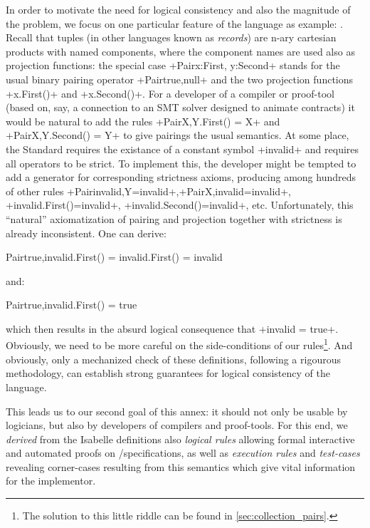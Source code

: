 In order to motivate the need for logical consistency and also the magnitude of the problem,
we focus on one particular feature of the language as example: . Recall that 
tuples (in other languages known as \emph{records}) are n-ary cartesian products with named 
components, where the component names are used also as projection functions: the special case 
\inlineocl+Pair{x:First, y:Second}+ stands for the usual binary pairing operator 
\inlineocl+Pair{true,null}+ and the two projection functions
\inlineocl+x.First()+ and \inlineocl+x.Second()+. For a developer of a compiler or proof-tool
(based on, say, a connection to an SMT solver designed to animate \OCL contracts) it would be natural 
to add the rules \inlineocl+Pair{X,Y}.First() = X+ and \inlineocl+Pair{X,Y}.Second() = Y+ to give
pairings the usual semantics. At some place, the \OCL Standard requires the existance
of a constant symbol \inlineocl+invalid+ and requires all operators to be strict. To implement this,
the developer might be tempted to add a generator for corresponding 
strictness axioms, producing among hundreds of other rules 
\inlineocl+Pair{invalid,Y}=invalid+,\inlineocl+Pair{X,invalid}=invalid+,
\inlineocl+invalid.First()=invalid+, \inlineocl+invalid.Second()=invalid+, etc.
Unfortunately, this ``natural'' axiomatization of pairing and projection together with strictness
is already inconsistent. One can derive:
\begin{ocl}
   Pair{true,invalid}.First() = invalid.First() = invalid
\end{ocl}
and:
\begin{ocl}
   Pair{true,invalid}.First() = true 
\end{ocl}
which then results in the absurd logical consequence that \inlineocl+invalid = true+. Obviously, we 
need to be more careful on the side-conditions of our rules\footnote{The solution to this little
riddle can be found in \autoref{sec:collection_pairs}.}. And obviously, only a mechanized check
of these definitions, following a rigourous methodology, can establish strong guarantees for
logical consistency of the \OCL language.

This leads us to our second goal of this annex: it should not only be usable by logicians, but also 
by developers  of compilers and proof-tools. For this end, we  \emph{derived} from the Isabelle 
definitions also \emph{logical rules} allowing formal interactive and automated proofs on 
\UML/\OCL specifications, as well as \emph{execution rules} and \emph{test-cases} 
revealing corner-cases resulting from this semantics which give vital information 
for the implementor.

